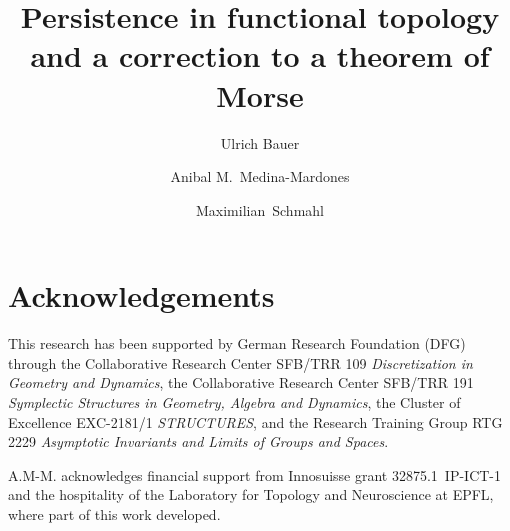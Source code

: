 \documentclass[nospthms, a4paper, final]{svjour3}
\theoremstyle{plain}
\theoremstyle{definition}
\begin{document}
\title{Persistence in functional topology and a correction to a theorem of Morse}

\author{Ulrich Bauer \and Anibal M.~Medina-Mardones \and Maximilian~Schmahl}



\maketitle

\begin{abstract}
	
\end{abstract}

\tableofcontents





\appendix


\section*{Acknowledgements}
This research has been supported by German Research Foundation (DFG) through the Collaborative Research Center SFB/TRR 109 \emph{Discretization in Geometry and Dynamics}, the Collaborative Research Center SFB/TRR 191 \emph{Symplectic Structures in Geometry, Algebra and Dynamics}, the Cluster of Excellence EXC-2181/1 \emph{STRUCTURES}, and the Research Training Group RTG 2229 \emph{Asymptotic Invariants and Limits of Groups and Spaces}.

A.M-M. acknowledges financial support from Innosuisse grant \mbox{32875.1 IP-ICT-1} and the hospitality of the Laboratory for Topology and Neuroscience at EPFL, where part of this work developed.



\end{document}
